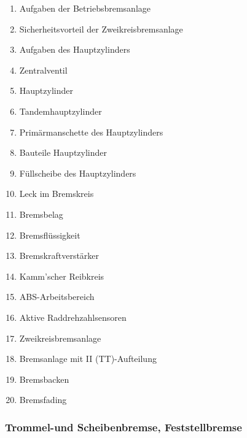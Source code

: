 \begin{enumerate}
\item
  Aufgaben der Betriebsbremsanlage\\
\item
  Sicherheitsvorteil der Zweikreisbremsanlage\\
\item
  Aufgaben des Hauptzylinders\\
\item
  Zentralventil\\
\item
  Hauptzylinder\\
\item
  Tandemhauptzylinder\\
\item
  Primärmanschette des Hauptzylinders\\
\item
  Bauteile Hauptzylinder\\
\item
  Füllscheibe des Hauptzylinders\\
\item
  Leck im Bremskreis\\
\item
  Bremsbelag\\
\item
  Bremsflüssigkeit\\
\item
  Bremskraftverstärker\\
\item
  Kamm'scher Reibkreis\\
\item
  ABS-Arbeitsbereich\\
\item
  Aktive Raddrehzahlsensoren\\
\item
  Zweikreisbremsanlage\\
\item
  Bremsanlage mit II (TT)-Aufteilung\\
\item
  Bremsbacken\\
\item
  Bremsfading
\end{enumerate}

\subsubsection{Trommel-und Scheibenbremse,
Feststellbremse}\label{trommel-und-scheibenbremse-feststellbremse}

